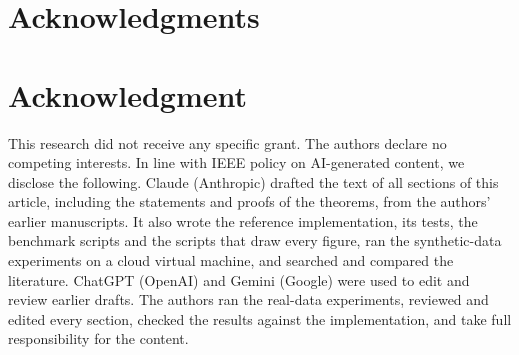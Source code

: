 \documentclass[10pt,journal,compsoc]{IEEEtran}
\begin{document}
\ifCLASSOPTIONcompsoc
  \section*{Acknowledgments}
\else
  \section*{Acknowledgment}
\fi
This research did not receive any specific grant. The authors declare no
competing interests. In line with IEEE policy on AI-generated content, we
disclose the following. Claude (Anthropic) drafted the text of all sections of
this article, including the statements and proofs of the theorems, from the
authors' earlier manuscripts. It also wrote the reference implementation, its
tests, the benchmark scripts and the scripts that draw every figure, ran the
synthetic-data experiments on a cloud virtual machine, and searched and
compared the literature. ChatGPT (OpenAI) and Gemini (Google) were used to edit
and review earlier drafts. The authors ran the real-data experiments, reviewed and edited
every section, checked the results against the implementation, and take full
responsibility for the content.



\end{document}
